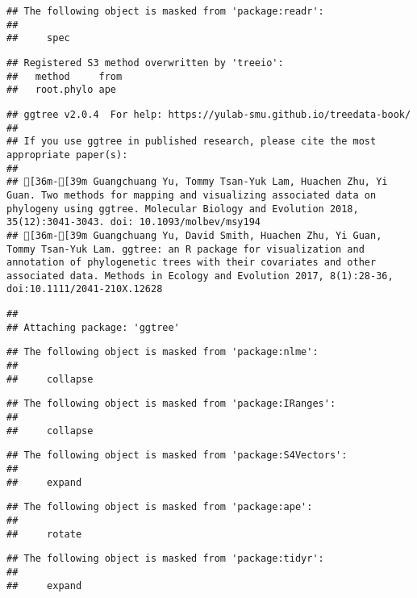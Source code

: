 \documentclass[]{article}
\begin{document}
\begin{verbatim}
## The following object is masked from 'package:readr':
## 
##     spec
\end{verbatim}

\begin{verbatim}
## Registered S3 method overwritten by 'treeio':
##   method     from
##   root.phylo ape
\end{verbatim}

\begin{verbatim}
## ggtree v2.0.4  For help: https://yulab-smu.github.io/treedata-book/
## 
## If you use ggtree in published research, please cite the most appropriate paper(s):
## 
## [36m-[39m Guangchuang Yu, Tommy Tsan-Yuk Lam, Huachen Zhu, Yi Guan. Two methods for mapping and visualizing associated data on phylogeny using ggtree. Molecular Biology and Evolution 2018, 35(12):3041-3043. doi: 10.1093/molbev/msy194
## [36m-[39m Guangchuang Yu, David Smith, Huachen Zhu, Yi Guan, Tommy Tsan-Yuk Lam. ggtree: an R package for visualization and annotation of phylogenetic trees with their covariates and other associated data. Methods in Ecology and Evolution 2017, 8(1):28-36, doi:10.1111/2041-210X.12628
\end{verbatim}

\begin{verbatim}
## 
## Attaching package: 'ggtree'
\end{verbatim}

\begin{verbatim}
## The following object is masked from 'package:nlme':
## 
##     collapse
\end{verbatim}

\begin{verbatim}
## The following object is masked from 'package:IRanges':
## 
##     collapse
\end{verbatim}

\begin{verbatim}
## The following object is masked from 'package:S4Vectors':
## 
##     expand
\end{verbatim}

\begin{verbatim}
## The following object is masked from 'package:ape':
## 
##     rotate
\end{verbatim}

\begin{verbatim}
## The following object is masked from 'package:tidyr':
## 
##     expand
\end{verbatim}
\end{document}
